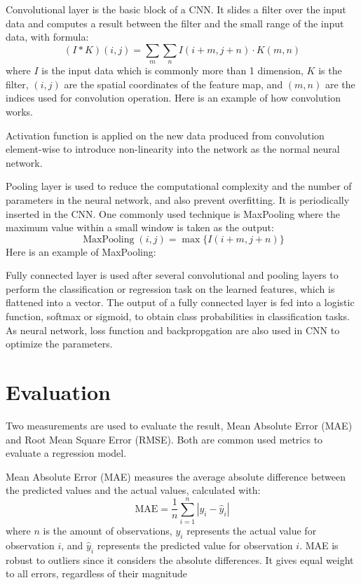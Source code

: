\documentclass[12pt,a4paper,english
]{tunithesis}
\begin{document}
Convolutional layer is the basic block of a CNN. It slides a filter over the input data and computes a result between the filter and the small range of the input data, with formula:
\begin{equation*}
    (I * K)(i, j)=\sum_m \sum_n I(i+m, j+n) \cdot K(m, n)
\end{equation*}
where $I$ is the input data which is commonly more than 1 dimension, $K$ is the filter, $(i, j)$ are the spatial coordinates of the feature map, and $(m, n)$ are the indices used for convolution operation. Here is an example of how convolution works.

Activation function is applied on the new data produced from convolution element-wise to introduce non-linearity into the network as the normal neural network.

Pooling layer is used to reduce the computational complexity and the number of parameters in the neural network, and also prevent overfitting. It is periodically inserted in the CNN. One commonly used technique is MaxPooling where the maximum value within a small window is taken as the output:
\begin{equation*}
    \operatorname{MaxPooling}(i, j)=\max \{I(i+m, j+n)\}
\end{equation*}
Here is an example of MaxPooling:

Fully connected layer is used after several convolutional and pooling layers to perform the classification or regression task on the learned features, which is flattened into a vector. The output of a fully connected layer is fed into a logistic function, softmax or sigmoid, to obtain class probabilities in classification tasks. As neural network, loss function and backpropgation are also used in CNN to optimize the parameters.


\section{Evaluation}
Two measurements are used to evaluate the result, Mean Absolute Error (MAE) and Root Mean Square Error (RMSE). Both are common used metrics to evaluate a regression model.

Mean Absolute Error (MAE) measures the average absolute difference between the predicted values and the actual values, calculated with: 
\begin{equation*}
    \mathrm{MAE}=\frac{1}{n} \sum_{i=1}^n\left|y_i-\hat{y}_i\right|
\end{equation*}
where $n$ is the amount of observations, $y_i$ represents the actual value for observation $i$, and $\hat{y}_i$ represents the predicted value for observation $i$. MAE is robust to outliers since it considers the absolute differences. It gives equal weight to all errors, regardless of their magnitude
\end{document}
